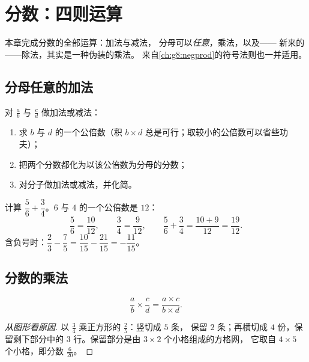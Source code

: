 \chapter{分数：四则运算}\label{ch:g8:fractions}

本章完成分数的全部运算：加法与减法，
分母可以\emph{任意}，乘法，以及——
新来的——除法，其实是一种伪装的乘法。
来自\cref{ch:g8:negprod}的符号法则也一并适用。

\section{分母任意的加法}

\begin{method}[通分]\label{met:g8:fractions:add}
对 $\frac ab$ 与 $\frac cd$ 做加法或减法：
\begin{enumerate}
  \item 求 $b$ 与 $d$ 的一个公倍数（积
        $b \times d$ 总是可行；取较小的公倍数可以省些功夫）；
  \item 把两个分数都化为以该公倍数为分母的分数；
  \item 对分子做加法或减法，并化简。
\end{enumerate}
\end{method}

\begin{example}\label{ex:g8:fractions:add}
计算 $\dfrac{5}{6} + \dfrac{3}{4}$。$6$ 与
$4$ 的一个公倍数是 $12$：
\[
\frac{5}{6} = \frac{10}{12},
\qquad
\frac{3}{4} = \frac{9}{12},
\qquad
\frac{5}{6} + \frac{3}{4} = \frac{10 + 9}{12} = \frac{19}{12}.
\]
含负号时：$\dfrac{2}{3} - \dfrac{7}{5} = \dfrac{10}{15} -
\dfrac{21}{15} = -\dfrac{11}{15}$。
\end{example}

\section{分数的乘法}

\begin{theorem}[分数的乘积]\label{thm:g8:fractions:mult}
\[
\frac{a}{b} \times \frac{c}{d} = \frac{a \times c}{b \times d} .
\]
\end{theorem}

\begin{proof}[从图形看原因]
以 $\frac34$ 乘正方形的 $\frac25$：竖切成 $5$ 条，
保留 $2$ 条；再横切成 $4$ 份，保留剩下部分中的 $3$
行。保留部分是由 $3 \times 2$ 个小格组成的方格网，
它取自 $4 \times 5$ 个小格，即分数 $\frac{6}{20}$。
\end{proof}

